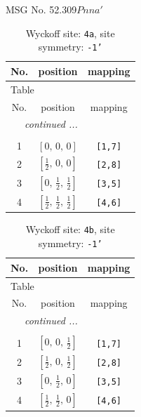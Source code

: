 \documentclass[fleqn,8pt]{jsarticle}
\begin{document}
\setcounter{MaxMatrixCols}{32}

\renewcommand{\tablename}{Table~}
\renewcommand{\figurename}{Figure~}
\begin{center}
\LARGE
MSG No. 52.309\quad$Pnna'$
\end{center}
\renewcommand{\arraystretch}{1.2}
\begin{longtable}{ccc}
\caption{Wyckoff site: {\tt 4a}, site symmetry: {\tt -1'}}
 \\
 \hline \hline
No. & position & mapping \\ \hline \endfirsthead

\multicolumn{2}{l}{\tablename\ \thetable{}} \\
 \hline \hline
No. & position & mapping \\ \hline \endhead

 \hline \hline
\multicolumn{2}{r}{\footnotesize\it continued ...} \\ \endfoot

 \hline \hline
\multicolumn{2}{r}{} \\ \endlastfoot

1 & $\left[ 0,\, 0,\, 0 \right]$ & {\tt [1,7]} \\ \hline
2 & $\left[ \frac{1}{2},\, 0,\, 0 \right]$ & {\tt [2,8]} \\ \hline
3 & $\left[ 0,\, \frac{1}{2},\, \frac{1}{2} \right]$ & {\tt [3,5]} \\ \hline
4 & $\left[ \frac{1}{2},\, \frac{1}{2},\, \frac{1}{2} \right]$ & {\tt [4,6]} \\
\end{longtable}
\renewcommand{\arraystretch}{1.2}
\begin{longtable}{ccc}
\caption{Wyckoff site: {\tt 4b}, site symmetry: {\tt -1'}}
 \\
 \hline \hline
No. & position & mapping \\ \hline \endfirsthead

\multicolumn{2}{l}{\tablename\ \thetable{}} \\
 \hline \hline
No. & position & mapping \\ \hline \endhead

 \hline \hline
\multicolumn{2}{r}{\footnotesize\it continued ...} \\ \endfoot

 \hline \hline
\multicolumn{2}{r}{} \\ \endlastfoot

1 & $\left[ 0,\, 0,\, \frac{1}{2} \right]$ & {\tt [1,7]} \\ \hline
2 & $\left[ \frac{1}{2},\, 0,\, \frac{1}{2} \right]$ & {\tt [2,8]} \\ \hline
3 & $\left[ 0,\, \frac{1}{2},\, 0 \right]$ & {\tt [3,5]} \\ \hline
4 & $\left[ \frac{1}{2},\, \frac{1}{2},\, 0 \right]$ & {\tt [4,6]} \\
\end{longtable}
\end{document}
